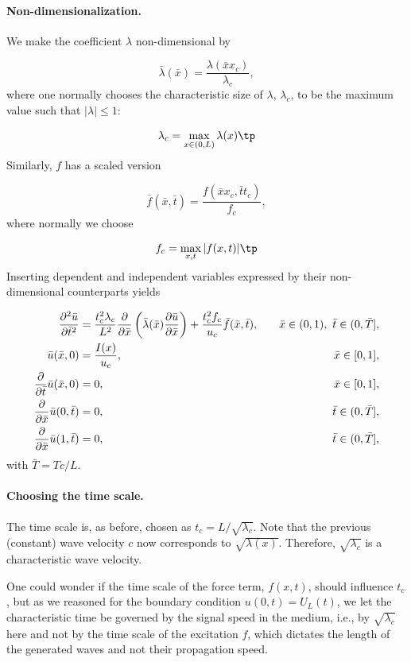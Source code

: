 \documentclass[graybox,envcountchap,sectrefs,final]{svmonodo}
\begin{document}
\paragraph{Non-dimensionalization.}
We make the coefficient $\lambda$ non-dimensional by

\begin{equation}
\bar\lambda(\bar x) = \frac{\lambda(\bar xx_c)}{\lambda_c},
\end{equation}
where one normally chooses the characteristic size of $\lambda$, $\lambda_c$,
to be the maximum value such that $|\lambda|\leq 1$:

\[ \lambda_c = \max_{x\in(0,L)}\lambda(x)\tp\]
Similarly, $f$ has a scaled version

\[ \bar f(\bar x,\bar t) = \frac{f(\bar x x_c, \bar t t_c)}{f_c},\]
where normally we choose

\[ f_c=\max_{x,t}|f(x,t)|\tp\]
Inserting dependent and independent variables expressed by their
non-dimensional counterparts yields

\begin{align*}
\frac{\partial^2 \bar u}{\partial \bar t^2} &=
\frac{t_c^2\lambda_c}{L^2}\frac{\partial}{\partial \bar x}\left(
\bar\lambda(\bar x) {\partial\bar u\over\partial\bar x}\right)
+ \frac{t_c^2f_c}{u_c}\bar f(\bar x,\bar t),
\quad & \bar x\in (0,1),\ \bar t\in (0,\bar T],\\ 
\bar u(\bar x,0) &= \frac{I(x)}{u_c},
\quad &\bar x\in [0,1],\\ 
{\partial\over\partial \bar t}\bar u(\bar x,0) &= 0,
\quad & \bar x\in [0,1],\\ 
\frac{\partial}{\partial \bar x}\bar u(0,\bar t) & = 0,
\quad  &\bar t\in (0,\bar T],\\ 
\frac{\partial}{\partial \bar x}\bar u(1,\bar t) & = 0,
\quad  &\bar t\in (0,\bar T],
\end{align*}
with $\bar T = Tc/L$.


\paragraph{Choosing the time scale.}
The time scale is, as before, chosen as $t_c
=L/\sqrt{\lambda_c}$. Note that the previous (constant) wave velocity
$c$ now corresponds to $\sqrt{\lambda (x)}$.  Therefore,
$\sqrt{\lambda_c}$ is a characteristic wave velocity.

One could wonder if the time scale of the force term, $f(x,t)$,
should influence $t_c$, but as we reasoned for the boundary condition
$u(0,t)=U_L(t)$, we let the characteristic time be governed by the
signal speed in the medium, i.e., by $\sqrt{\lambda_c}$ here and not
by the time scale of the excitation $f$, which dictates the
length of the generated waves and not their propagation speed.
\end{document}
